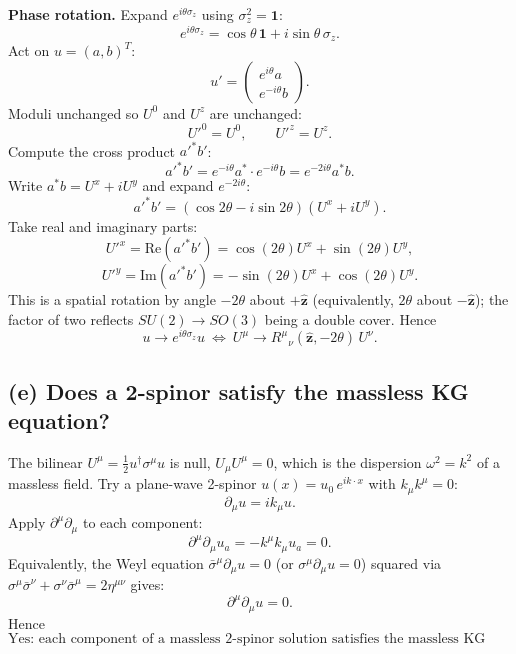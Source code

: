\documentclass[11pt]{article}
\begin{document}
\textbf{Phase rotation.} Expand $e^{i\theta\sigma_z}$ using $\sigma_z^2 = \bm 1$:
\[ e^{i\theta\sigma_z} = \cos\theta\,\bm 1 + i\sin\theta\,\sigma_z. \]
Act on $u=(a,b)^T$:
\[ u' = \begin{pmatrix}e^{i\theta}a\\ e^{-i\theta}b\end{pmatrix}. \]
Moduli unchanged so $U^0$ and $U^z$ are unchanged:
\[ U'^0 = U^0,\qquad U'^z = U^z. \]
Compute the cross product $a'^*b'$:
\[ a'^* b' = e^{-i\theta}a^*\cdot e^{-i\theta}b = e^{-2i\theta}a^*b. \]
Write $a^*b = U^x + iU^y$ and expand $e^{-2i\theta}$:
\[ a'^*b' = (\cos 2\theta - i\sin 2\theta)(U^x + iU^y). \]
Take real and imaginary parts:
\[ U'^x = \mathrm{Re}(a'^*b') = \cos(2\theta)U^x + \sin(2\theta)U^y, \]
\[ U'^y = \mathrm{Im}(a'^*b') = -\sin(2\theta)U^x + \cos(2\theta)U^y. \]
This is a spatial rotation by angle $-2\theta$ about $+\hat{\bm z}$ (equivalently, $2\theta$ about $-\hat{\bm z}$); the factor of two reflects $SU(2)\to SO(3)$ being a double cover. Hence
\begin{equation}
\boxed{u\to e^{i\theta\sigma_z}u\ \Longleftrightarrow\ U^\mu\to R^\mu{}_\nu(\hat{\bm z},-2\theta)\,U^\nu.}
\end{equation}

\subsection*{(e) Does a 2-spinor satisfy the massless KG equation?}

The bilinear $U^\mu=\tfrac12 u^\dagger\sigma^\mu u$ is null, $U_\mu U^\mu = 0$, which is the dispersion $\omega^2 = k^2$ of a massless field. Try a plane-wave 2-spinor $u(x) = u_0\,e^{ik\cdot x}$ with $k_\mu k^\mu = 0$:
\[ \partial_\mu u = ik_\mu u. \]
Apply $\partial^\mu\partial_\mu$ to each component:
\[ \partial^\mu\partial_\mu u_a = -k^\mu k_\mu u_a = 0. \]
Equivalently, the Weyl equation $\bar\sigma^\mu\partial_\mu u = 0$ (or $\sigma^\mu\partial_\mu u = 0$) squared via $\sigma^\mu\bar\sigma^\nu + \sigma^\nu\bar\sigma^\mu = 2\eta^{\mu\nu}$ gives:
\[ \partial^\mu\partial_\mu u = 0. \]
Hence
\begin{equation}
\boxed{\text{Yes: each component of a massless 2-spinor solution satisfies the massless KG equation.}}
\end{equation}
\end{document}

